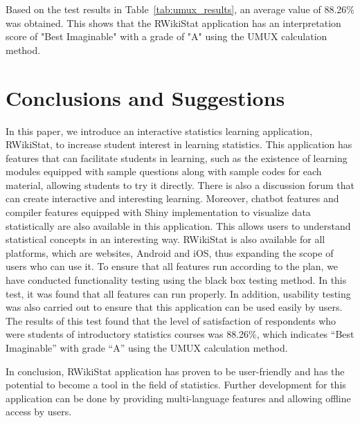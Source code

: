 \documentclass[conference,a4paper]{IEEEtran}
\begin{document}
Based on the test results in Table~\ref{tab:umux_results}, an average value of 88.26\% was obtained. This shows that the RWikiStat application has an interpretation score of "Best Imaginable" with a grade of "A" using the UMUX calculation method.



\section{Conclusions and Suggestions}
\label{sect:conclusion}

In this paper, we introduce an interactive statistics learning application, RWikiStat, to increase student interest in learning statistics. This application has features that can facilitate students in learning, such as the existence of learning modules equipped with sample questions along with sample codes for each material, allowing students to try it directly. There is also a discussion forum that can create interactive and interesting learning. Moreover, chatbot features and compiler features equipped with Shiny implementation to visualize data statistically are also available in this application. This allows users to understand statistical concepts in an interesting way. RWikiStat is also available for all platforms, which are websites, Android and iOS, thus expanding the scope of users who can use it. To ensure that all features run according to the plan, we have conducted functionality testing using the black box testing method. In this test, it was found that all features can run properly. In addition, usability testing was also carried out to ensure that this application can be used easily by users. The results of this test found that the level of satisfaction of respondents who were students of introductory statistics courses was 88.26\%, which indicates “Best Imaginable” with grade “A” using the UMUX calculation method.

In conclusion, RWikiStat application has proven to be user-friendly and has the potential to become a tool in the field of statistics. Further development for this application can be done by providing multi-language features and allowing offline access by users.


\balance
\end{document}
